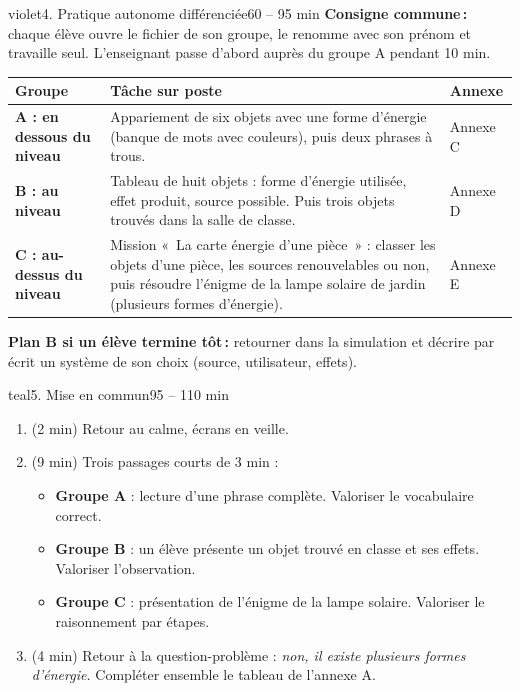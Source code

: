 \documentclass[11pt,a4paper]{article}
\begin{document}
\begin{etape}{violet}{4. Pratique autonome différenciée}{60 -- 95 min}
\textbf{Consigne commune\,:} chaque élève ouvre le fichier de son groupe, le renomme avec son prénom et travaille seul. L'enseignant passe d'abord auprès du groupe A pendant 10 min.

\medskip
\begin{tabularx}{\linewidth}{>{\bfseries}p{3cm}Y p{3.2cm}}
\toprule
Groupe & Tâche sur poste & Annexe\\
\midrule
A : en dessous du niveau &
Appariement de six objets avec une forme d'énergie (banque de mots avec couleurs), puis deux phrases à trous. & Annexe C\\
B : au niveau &
Tableau de huit objets : forme d'énergie utilisée, effet produit, source possible. Puis trois objets trouvés dans la salle de classe. & Annexe D\\
C : au-dessus du niveau &
Mission «~La carte énergie d'une pièce~» : classer les objets d'une pièce, les sources renouvelables ou non, puis résoudre l'énigme de la lampe solaire de jardin (plusieurs formes d'énergie). & Annexe E\\
\bottomrule
\end{tabularx}

\medskip
\textbf{Plan B si un élève termine tôt\,:} retourner dans la simulation et décrire par écrit un système de son choix (source, utilisateur, effets).
\end{etape}

\begin{etape}{teal}{5. Mise en commun}{95 -- 110 min}
\begin{enumerate}
 \item (2 min) Retour au calme, écrans en veille.
 \item (9 min) Trois passages courts de 3 min :
 \begin{itemize}
  \item \textbf{Groupe A} : lecture d'une phrase complète. Valoriser le vocabulaire correct.
  \item \textbf{Groupe B} : un élève présente un objet trouvé en classe et ses effets. Valoriser l'observation.
  \item \textbf{Groupe C} : présentation de l'énigme de la lampe solaire. Valoriser le raisonnement par étapes.
 \end{itemize}
 \item (4 min) Retour à la question-problème : \textit{non, il existe plusieurs formes d'énergie.} Compléter ensemble le tableau de l'annexe A.
\end{enumerate}
\end{etape}
\end{document}
